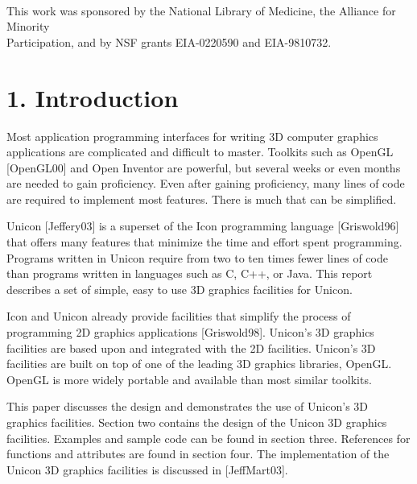 \documentclass[letterpaper]{article}
\begin{document}
\ \\

\bigskip

\bigskip

\bigskip

\bigskip

\bigskip

\bigskip

{
This work was sponsored by the National Library of Medicine, the
Alliance for Minority\\ Participation, and by NSF grants
EIA-0220590 and EIA-9810732.}

\pagebreak

\section[1. Introduction]{1. Introduction}

\bigskip

{
Most application programming interfaces for writing 3D computer graphics applications are complicated and difficult to
master. Toolkits such as OpenGL [OpenGL00] and Open Inventor are powerful, but several weeks or even months are needed
to gain proficiency. Even after gaining proficiency, many lines of code are required to implement most features. There
is much that can be simplified. }

{
Unicon [Jeffery03] is a superset of the Icon programming language [Griswold96] that offers many features that minimize
the time and effort spent programming. Programs written in Unicon require from two to ten times fewer lines of code
than programs written in languages such as C, C++, or Java. This report describes a set of simple, easy to use 3D
graphics facilities for Unicon.}

{
Icon and Unicon already provide facilities that simplify the process of programming 2D graphics applications
[Griswold98]. Unicon's 3D graphics facilities are based upon and integrated with the 2D facilities. Unicon's 3D
facilities are built on top of one of the leading 3D graphics libraries, OpenGL. OpenGL is more widely portable and
available than most similar toolkits.}

{
This paper discusses the design and demonstrates the use of Unicon's 3D graphics facilities. Section two contains the
design of the Unicon 3D graphics facilities. Examples and sample code can be found in section three. References for
functions and attributes are found in section four. The implementation of the Unicon 3D graphics facilities is
discussed in [JeffMart03].}
\end{document}
